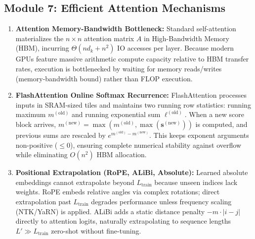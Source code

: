 \documentclass[11pt,a4paper]{article}
\begin{document}
	\subsection*{Module 7: Efficient Attention Mechanisms}
	\begin{enumerate}
		\item \textbf{Attention Memory-Bandwidth Bottleneck:} Standard self-attention materializes the $n \times n$ attention matrix $A$ in High-Bandwidth Memory (HBM), incurring $\Theta(n d_k + n^2)$ IO accesses per layer. Because modern GPUs feature massive arithmetic compute capacity relative to HBM transfer rates, execution is bottlenecked by waiting for memory reads/writes (memory-bandwidth bound) rather than FLOP execution.
		\item \textbf{FlashAttention Online Softmax Recurrence:} FlashAttention processes inputs in SRAM-sized tiles and maintains two running row statistics: running maximum $m^{(\mathrm{old})}$ and running exponential sum $\ell^{(\mathrm{old})}$. When a new score block arrives, $m^{(\mathrm{new})} = \max(m^{(\mathrm{old})}, \max(\mathbf{s}^{(\mathrm{new})}))$ is computed, and previous sums are rescaled by $e^{m^{(\mathrm{old})} - m^{(\mathrm{new})}}$. This keeps exponent arguments non-positive ($\le 0$), ensuring complete numerical stability against overflow while eliminating $O(n^2)$ HBM allocation.
		\item \textbf{Positional Extrapolation (RoPE, ALiBi, Absolute):} Learned absolute embeddings cannot extrapolate beyond $L_{\mathrm{train}}$ because unseen indices lack weights. RoPE embeds relative angles via complex rotations; direct extrapolation past $L_{\mathrm{train}}$ degrades performance unless frequency scaling (NTK/YaRN) is applied. ALiBi adds a static distance penalty $-m \cdot |i - j|$ directly to attention logits, naturally extrapolating to sequence lengths $L' \gg L_{\mathrm{train}}$ zero-shot without fine-tuning.
	\end{enumerate}
\end{document}

